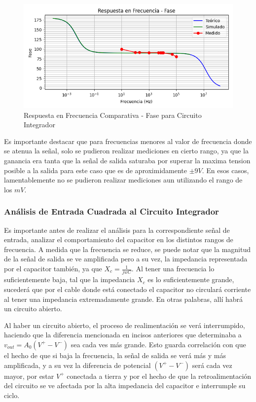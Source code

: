 \begin{figure}[H]
    \centering 
    \includegraphics [scale=0.6] {../Ejercicio3-CircuitoIntegradoresyDerivadores/Imagenes/comparativo-integrador-fase.png} 
    \caption{Respuesta en Frecuencia Comparativa - Fase para Circuito Integrador}
    \label{fig:emptyPlotTool}
\end{figure}

Es importante destacar que para frecuencias menores al valor de frecuencia donde se atenua la señal, solo se pudieron realizar mediciones en cierto rango,
ya que la ganancia era tanta que la señal de salida saturaba por superar la maxima tension posible a la salida para este caso que es de aproximidamente $\pm 9V$.
En esos casos, lamentablemente no se pudieron realizar mediciones aun utilizando el rango de los $mV$.

\subsubsection{Análisis de Entrada Cuadrada al Circuito Integrador}

Es importante antes de realizar el análisis para la correspondiente señal de entrada, analizar el comportamiento del capacitor en los distintos rangos de frecuencia.
A medida que la frecuencia se reduce, se puede notar que la magnitud de la señal de salida se ve amplificada pero a su vez, la impedancia representada por el capacitor
también, ya que $X_c= \frac{1}{jwC}$. Al tener una frecuencia lo suficientemente baja, tal que la impedancia $X_c$ es lo suficientemente grande, sucederá que por el cable 
donde está conectado el capacitor no circulará corriente al tener una impedancia extremadamente grande. En otras palabras, allí habrá un circuito abierto.

Al haber un circuito abierto, el proceso de realimentación se verá interrumpido, haciendo que la diferencia mencionada en incisos anteriores que determinaba a 
$v_{out}=A_0(V^+-V^-)$ sea cada ves más grande. Esto guarda correlación con que el hecho de que si baja la frecuencia, la señal de salida se verá más y más amplificada,
y a su vez la diferencia de potencial $(V^+-V^-)$ será cada vez mayor, por estar $V^+$ conectada a tierra y por el hecho de que la retroalimentación del circuito se ve afectada
por la alta impedancia del capacitor e interrumple su ciclo.

